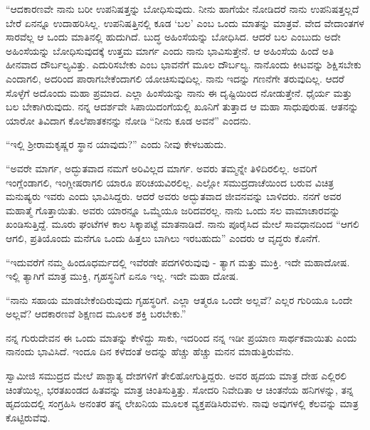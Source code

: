  “ಆದಕಾರಣವೇ ನಾನು ಬರೀ ಉಪನಿಷತ್ತನ್ನು ಬೋಧಿಸುವುದು. ನೀನು ಹಾಗೆಯೇ ನೋಡಿದರೆ ನಾನು ಉಪನಿಷತ್ತಲ್ಲದೆ ಬೇರೆ ಏನನ್ನೂ ಉದಾಹರಿಸಿಲ್ಲ. ಉಪನಿಷತ್ತಿನಲ್ಲಿ ಕೂಡ ‘ಬಲ’ ಎಂಬ ಒಂದು ಮಾತನ್ನು ಮಾತ್ರವೆ. ವೇದ ವೇದಾಂತಗಳ ಸಾರವೆಲ್ಲ ಆ ಒಂದು ಮಾತಿನಲ್ಲಿ ಹುದುಗಿದೆ. ಬುದ್ಧ ಅಹಿಂಸೆಯನ್ನು ಬೋಧಿಸಿದ. ಆದರೆ ಬಲ ಎಂಬುದು ಅದೇ ಅಹಿಂಸೆಯನ್ನು ಬೋಧಿಸುವುದಕ್ಕೆ ಉತ್ತಮ ಮಾರ್ಗ ಎಂದು ನಾನು ಭಾವಿಸುತ್ತೇನೆ. ಆ ಅಹಿಂಸೆಯ ಹಿಂದೆ ಅತಿ ಹೀನವಾದ ದೌರ್ಬಲ್ಯವಿತ್ತು. ಎದುರಿಸಬೇಕು ಎಂಬ ಭಾವನೆಗೆ ಮೂಲ ದೌರ್ಬಲ್ಯ. ನಾನೊಂದು ಕೀಟವನ್ನು ಶಿಕ್ಷಿಸಬೇಕು ಎಂದಾಗಲಿ, ಅದರಿಂದ ಪಾರಾಗಬೇಕೆಂದಾಗಲಿ ಯೋಚಿಸುವುದಿಲ್ಲ. ನಾನು ಇದನ್ನು ಗಣನೆಗೇ ತರುವುದಿಲ್ಲ. ಆದರೆ ಸೊಳ್ಳೆಗೆ ಅದೊಂದು ಮಹಾ ಪ್ರಮಾದ. ಎಲ್ಲಾ ಹಿಂಸೆಯನ್ನು ನಾನು ಈ ದೃಷ್ಟಿಯಿಂದ ನೋಡುತ್ತೇನೆ. ಧೈರ್ಯ ಮತ್ತು ಬಲ ಬೇಕಾಗಿರುವುದು. ನನ್ನ ಆದರ್ಶವೇ ಸಿಪಾಯಿದಂಗೆಯಲ್ಲಿ ಖೂನಿಗೆ ತುತ್ತಾದ ಆ ಮಹಾ ಸಾಧುಪುರುಷ. ಆತನನ್ನು ಯಾರೋ ತಿವಿದಾಗ ಕೊಲೆಪಾತಕನನ್ನು ನೋಡಿ “ನೀನು ಕೂಡ ಅವನೆ” ಎಂದನು. 

 “ಇಲ್ಲಿ ಶ‍್ರೀರಾಮಕೃಷ್ಣರ ಸ್ಥಾನ ಯಾವುದು?” ಎಂದು ನೀವು ಕೇಳಬಹುದು. 

 “ಅವರೇ ಮಾರ್ಗ, ಅದ್ಭುತವಾದ ನಮಗೆ ಅರಿವಿಲ್ಲದ ಮಾರ್ಗ. ಅವರು ತಮ್ಮನ್ನೇ ತಿಳಿದಿರಲಿಲ್ಲ. ಅವರಿಗೆ ಇಂಗ್ಲೆಂಡಾಗಲಿ, ಇಂಗ್ಲೀಷರಾಗಲಿ ಯಾರೂ ಪರಿಚಯವಿರಲಿಲ್ಲ. ಎಲ್ಲೋ ಸಮುದ್ರದಾಚೆಯಿಂದ ಬರುವ ವಿಚಿತ್ರ ಮನುಷ್ಯರು ಇವರು ಎಂದು ಭಾವಿಸಿದ್ದರು. ಆದರೆ ಅವರು ಅದ್ಭುತವಾದ ಜೀವನವನ್ನು ಬಾಳಿದರು. ನನಗೆ ಅವರ ಮಹಾತ್ಮೆ ಗೊತ್ತಾಯಿತು. ಅವರು ಯಾರನ್ನೂ ಒಮ್ಮೆಯೂ ಜರಿದವರಲ್ಲ. ನಾನು ಒಂದು ಸಲ ವಾಮಾಚಾರವನ್ನು ಖಂಡಿಸುತ್ತಿದ್ದೆ. ಮೂರು ಘಂಟೆಗಳ ಕಾಲ ಸಿಕ್ಕಾಪಟ್ಟೆ ಮಾತನಾಡಿದೆ. ನಾನು ಪೂರೈಸಿದ ಮೇಲೆ ಸಾವಧಾನದಿಂದ “ಆಗಲಿ ಆಗಲಿ, ಪ್ರತಿಯೊಂದು ಮನೆಗೂ ಒಂದು ಹಿತ್ತಲು ಬಾಗಿಲು ಇರಬಹುದು” ಎಂದರು ಆ ವೃದ್ಧರು ಕೊನೆಗೆ. 

 “ಇದುವರೆಗೆ ನಮ್ಮ ಹಿಂದೂಧರ್ಮದಲ್ಲಿ ಇವೆರಡೇ ಪದಗಳಿರುವುವು - ತ್ಯಾಗ ಮತ್ತು ಮುಕ್ತಿ. ಇದೇ ಮಹಾದೋಷ. ಇಲ್ಲಿ ತ್ಯಾಗಿಗೆ ಮಾತ್ರ ಮುಕ್ತಿ, ಗೃಹಸ್ಥನಿಗೆ ಏನೂ ಇಲ್ಲ. ಇದೇ ಮಹಾ ದೋಷ. 

 “ನಾನು ಸಹಾಯ ಮಾಡಬೇಕೆಂದಿರುವುದು ಗೃಹಸ್ಥರಿಗೆ. ಎಲ್ಲಾ ಆತ್ಮರೂ ಒಂದೇ ಅಲ್ಲವೆ? ಎಲ್ಲರ ಗುರಿಯೂ ಒಂದೇ ಅಲ್ಲವೆ? ಆದಕಾರಣವೆ ಶಿಕ್ಷಣದ ಮೂಲಕ ಶಕ್ತಿ ಬರಬೇಕು.” 

 ನನ್ನ ಗುರುದೇವನ ಈ ಒಂದು ಮಾತನ್ನು ಕೇಳಿದ್ದು ಸಾಕು, ಇದರಿಂದ ನನ್ನ ಇಡೀ ಪ್ರಯಾಣ ಸಾರ್ಥಕವಾಯಿತು ಎಂದು ನಾನಂದು ಭಾವಿಸಿದೆ. ಇಂದೂ ದಿನ ಕಳೆದಂತೆ ಅದನ್ನು ಹೆಚ್ಚು ಹೆಚ್ಚು ಮನನ ಮಾಡುತ್ತಿರುವೆನು. 

\delimiter

 ಸ್ವಾಮೀಜಿ ಸಮುದ್ರದ ಮೇಲೆ ಪಾಶ್ಚಾತ್ಯ ದೇಶಗಳಿಗೆ ತೇಲಿಹೋಗುತ್ತಿದ್ದರು. ಅವರ ಹೃದಯ ಮಾತ್ರ ದೇಹ ಎಲ್ಲಿರಲಿ ಚಿಂತೆಯಿಲ್ಲ, ಭರತಖಂಡದ ಹಿತವನ್ನು ಮಾತ್ರ ಚಿಂತಿಸುತ್ತಿತ್ತು. ಸೋದರಿ ನಿವೇದಿತಾ ಆ ಚಿಂತನೆಯ ಹನಿಗಳನ್ನು, ತನ್ನ ಹೃದಯದಲ್ಲಿ ಸಂಗ್ರಹಿಸಿ ಅನಂತರ ತನ್ನ ಲೇಖನಿಯ ಮೂಲಕ ವ್ಯಕ್ತಪಡಿಸಿರುವಳು. ನಾವು ಅವುಗಳಲ್ಲಿ ಕೆಲವನ್ನು ಮಾತ್ರ ಕೊಟ್ಟಿರುವೆವು.

